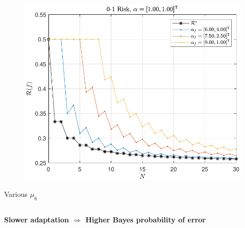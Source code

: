 \documentclass{beamer}
\begin{document}
\begin{frame}
\begin{columns}[c]
\begin{column}{.5\linewidth}
\begin{figure}
\centering
\includegraphics[width=1\linewidth]{Risk_01_Dir_N_leg_f_mu.pdf}
\label{fig:Risk_01_Dir_N_leg_f_mu}
\end{figure}
\vspace{-2.5em}
\centering
\footnotesize
Various $\mu_{\tilde{\uptheta}}$

\end{column}

\end{columns}

\vspace{1em}
\centering
\textbf{Slower adaptation $\Rightarrow$ Higher Bayes probability of error}

\end{frame}
\end{document}
